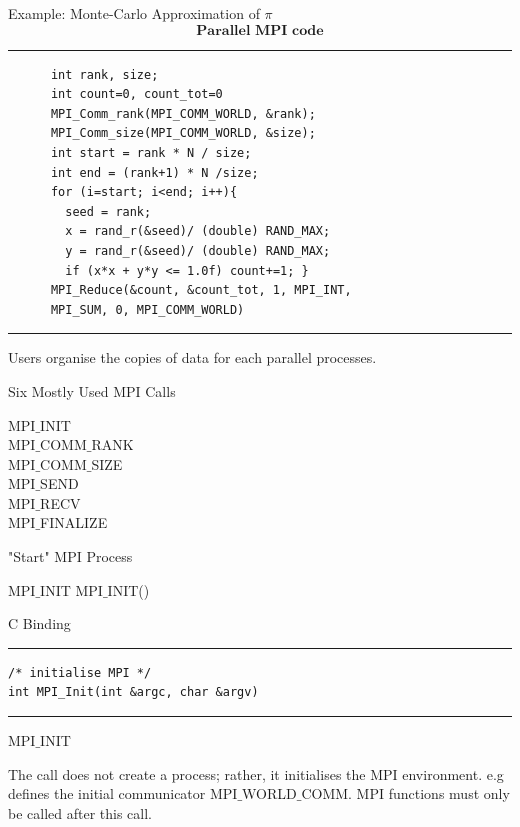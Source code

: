 \documentclass[xcolor=dvipsnames]{beamer}
\begin{document}
\begin{frame}[fragile]{Example: Monte-Carlo Approximation of $\pi$}
$$\textbf{Parallel MPI code}$$
\rule{\textwidth}{1pt}
\scriptsize
\begin{verbatim}
      int rank, size;
      int count=0, count_tot=0
      MPI_Comm_rank(MPI_COMM_WORLD, &rank);
      MPI_Comm_size(MPI_COMM_WORLD, &size);
      int start = rank * N / size;
      int end = (rank+1) * N /size;
      for (i=start; i<end; i++){
        seed = rank;
        x = rand_r(&seed)/ (double) RAND_MAX;
        y = rand_r(&seed)/ (double) RAND_MAX;
        if (x*x + y*y <= 1.0f) count+=1; }
      MPI_Reduce(&count, &count_tot, 1, MPI_INT,
      MPI_SUM, 0, MPI_COMM_WORLD)
\end{verbatim}
\rule{\textwidth}{1pt}
Users organise the copies of data for each parallel processes.
\end{frame}

 \begin{frame}{Six Mostly Used MPI Calls}
 \begin{outline}
     \1 MPI$\_$INIT\\
     \1 MPI$\_$COMM$\_$RANK\\
     \1 MPI$\_$COMM$\_$SIZE\\
     \1 MPI$\_$SEND\\
     \1 MPI$\_$RECV\\
     \1 MPI$\_$FINALIZE
 \end{outline}
 \end{frame}

\begin{frame}[fragile]{"Start" MPI Process}
\begin{block}{MPI$\_$INIT}
MPI$\_$INIT()
\end{block}

C Binding
\rule{\textwidth}{1pt}
\scriptsize
\begin{verbatim}
/* initialise MPI */
int MPI_Init(int &argc, char &argv)
\end{verbatim}
\rule{\textwidth}{1pt}
\end{frame}

\begin{frame}{MPI$\_$INIT}
\begin{outline}
\1 The call does not create a process; rather, it initialises the MPI environment.
\2 e.g defines the initial communicator MPI$\_$WORLD$\_$COMM.
\1 MPI functions must only be called after this call.
\end{outline}
\end{frame}
\end{document}
